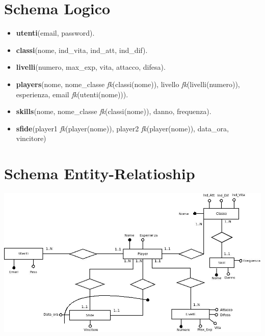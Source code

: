 \documentclass[a4paper,12pt]{article}
\begin{document}
\section*{Schema Logico}
\begin{itemize}
\item \textbf{utenti}(email, password).
\item \textbf{classi}(nome, ind\_vita, ind\_att, ind\_dif).
\item \textbf{livelli}(numero, max\_exp, vita, attacco, difesa).
\item \textbf{players}(nome, nome\_classe \textit{fk}(classi(nome)), livello \textit{fk}(livelli(numero)),\\
 esperienza, email \textit{fk}(utenti(nome))).
\item \textbf{skills}(nome, nome\_classe \textit{fk}(classi(nome)), danno, frequenza).
\item \textbf{sfide}(player1 \textit{fk}(player(nome)), player2 \textit{fk}(player(nome)), data\_ora,\\ vincitore)
\end{itemize} 
\section*{Schema Entity-Relatioship}
\includegraphics[scale=0.4]{SchemaER.jpeg}
\end{document}
